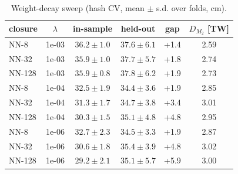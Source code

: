 \begin{table}[t]\centering\footnotesize
\caption{Weight-decay sweep (hash CV, mean $\pm$ s.d. over folds, cm).}
\label{tab:reg}
\begin{tabular}{lccccc}
\toprule
closure & $\lambda$ & in-sample & held-out & gap & $D_{M_2}$ [TW] \\
\midrule
\textsc{NN-8} & 1e-03 & $36.2\pm1.0$ & $37.6\pm6.1$ & +1.4 & 2.59 \\
\textsc{NN-32} & 1e-03 & $35.9\pm1.0$ & $37.7\pm5.7$ & +1.8 & 2.74 \\
\textsc{NN-128} & 1e-03 & $35.9\pm0.8$ & $37.8\pm6.2$ & +1.9 & 2.73 \\
\textsc{NN-8} & 1e-04 & $32.5\pm1.9$ & $34.4\pm3.6$ & +1.9 & 2.85 \\
\textsc{NN-32} & 1e-04 & $31.3\pm1.7$ & $34.7\pm3.8$ & +3.4 & 3.01 \\
\textsc{NN-128} & 1e-04 & $30.3\pm1.5$ & $35.1\pm4.8$ & +4.8 & 2.95 \\
\textsc{NN-8} & 1e-06 & $32.7\pm2.3$ & $34.5\pm3.3$ & +1.9 & 2.87 \\
\textsc{NN-32} & 1e-06 & $30.6\pm1.8$ & $35.4\pm3.9$ & +4.8 & 3.02 \\
\textsc{NN-128} & 1e-06 & $29.2\pm2.1$ & $35.1\pm5.7$ & +5.9 & 3.00 \\
\bottomrule
\end{tabular}
\end{table}
